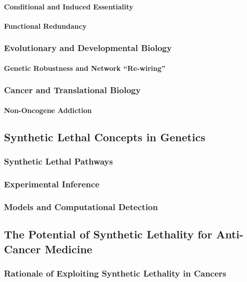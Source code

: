 \paragraph{Conditional and Induced Essentiality}
\paragraph{Functional Redundancy}
\subsubsection{Evolutionary and Developmental Biology}
\paragraph{Genetic Robustness and Network ``Re-wiring''}
\subsubsection{Cancer and Translational Biology}
\paragraph{Non-Oncogene Addiction}

\subsection{Synthetic Lethal Concepts in Genetics}
\subsubsection{Synthetic Lethal Pathways}
\subsubsection{Experimental Inference}
\subsubsection{Models and Computational Detection}

\subsection{The Potential of Synthetic Lethality for Anti-Cancer Medicine}
\subsubsection{Rationale of Exploiting Synthetic Lethality in Cancers}
